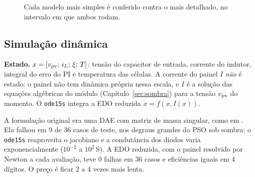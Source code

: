 \begin{figure}[htbp]
\centering
{}
\caption{Cada modelo mais simples \'e conferido contra o mais detalhado, no intervalo em que ambos rodam.}
\label{fig:hierarquia}
\end{figure}

\subsection{Simula\c{c}\~ao din\^amica}

\textbf{Estado.} $x=[v_{\mathrm{pv}};\,i_L;\,\xi;\,T]$: tens\~ao do capacitor de entrada, corrente do indutor, integral do erro do PI e temperatura das c\'elulas. A corrente do painel
$I$ \emph{n\~ao} \'e estado: o painel n\~ao tem din\^amica pr\'opria nessa escala, e $I$ \'e a solu\c{c}\~ao das equa\c{c}\~oes alg\'ebricas do m\'odulo (Cap\'itulo~\ref{sec:sombra}) para a tens\~ao
$v_{\mathrm{pv}}$ do momento. O \texttt{ode15s} integra a EDO reduzida $\dot x=f(x,I(x))$.

\begin{atencao}
A formula\c{c}\~ao original era uma DAE com matriz de massa singular, como em . Ela falhou em 9 de 36 casos de teste, nos degraus grandes do PSO sob sombra: o
\texttt{ode15s} reaproveita o jacobiano e a condut\^ancia dos diodos varia exponencialmente ($10^{-2}$ a $10^{2}$\,S). A EDO reduzida, com o painel resolvido por Newton a cada
avalia\c{c}\~ao, teve 0 falhas em 36 casos e efici\^encias iguais em 4 d\'igitos. O pre\c{c}o \'e ficar 2 a 4 vezes mais lenta.
\end{atencao}

